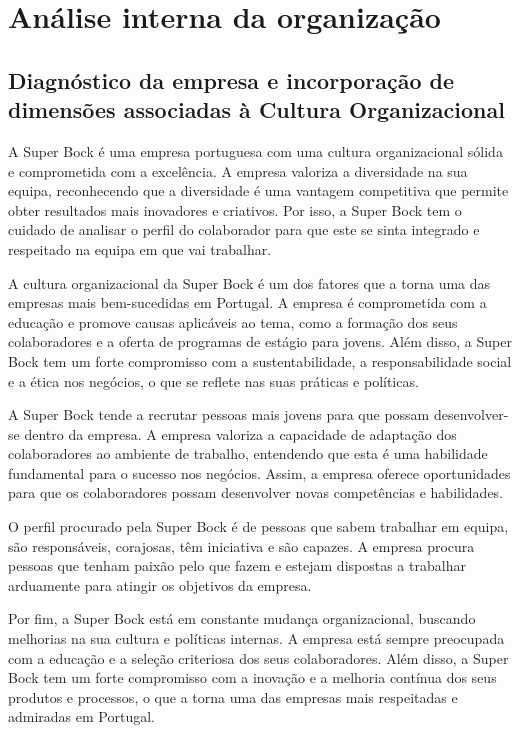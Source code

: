\chapter{Análise interna da organização}
\label{Chapter2} %

\section{Diagnóstico da empresa e incorporação de dimensões associadas à Cultura Organizacional}

A Super Bock é uma empresa portuguesa com uma cultura organizacional sólida e comprometida com a excelência. A empresa valoriza a diversidade na sua equipa, reconhecendo que a diversidade é uma vantagem competitiva que permite obter resultados mais inovadores e criativos. Por isso, a Super Bock tem o cuidado de analisar o perfil do colaborador para que este se sinta integrado e respeitado na equipa em que vai trabalhar.

A cultura organizacional da Super Bock é um dos fatores que a torna uma das empresas mais bem-sucedidas em Portugal. A empresa é comprometida com a educação e promove causas aplicáveis ao tema, como a formação dos seus colaboradores e a oferta de programas de estágio para jovens. Além disso, a Super Bock tem um forte compromisso com a sustentabilidade, a responsabilidade social e a ética nos negócios, o que se reflete nas suas práticas e políticas.

A Super Bock tende a recrutar pessoas mais jovens para que possam desenvolver-se dentro da empresa. A empresa valoriza a capacidade de adaptação dos colaboradores ao ambiente de trabalho, entendendo que esta é uma habilidade fundamental para o sucesso nos negócios. Assim, a empresa oferece oportunidades para que os colaboradores possam desenvolver novas competências e habilidades.

O perfil procurado pela Super Bock é de pessoas que sabem trabalhar em equipa, são responsáveis, corajosas, têm iniciativa e são capazes. A empresa procura pessoas que tenham paixão pelo que fazem e estejam dispostas a trabalhar arduamente para atingir os objetivos da empresa.

Por fim, a Super Bock está em constante mudança organizacional, buscando melhorias na sua cultura e políticas internas. A empresa está sempre preocupada com a educação e a seleção criteriosa dos seus colaboradores. Além disso, a Super Bock tem um forte compromisso com a inovação e a melhoria contínua dos seus produtos e processos, o que a torna uma das empresas mais respeitadas e admiradas em Portugal. 


